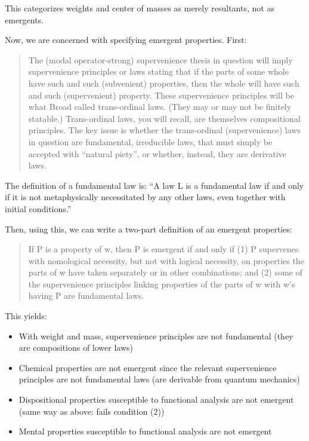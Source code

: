 \documentclass{article}
\begin{document}
This categorizes weights and center of masses as merely resultants, not as emergents.

Now, we are concerned with specifying emergent properties. First:

\begin{quote}
The (modal operator-strong) supervenience thesis in question will imply supervenience principles or laws stating that if the parts of some whole have such and such (subvenient) properties, then the whole will have such and such (supervenient) property. These supervenience principles will be what Broad called trans-ordinal laws. (They may or may not be finitely statable.) Trans-ordinal laws, you will recall, are themselves compositional principles. The key issue is whether the trans-ordinal (supervenience) laws in question are fundamental, irreducible laws, that must simply be accepted with ``natural piety'', or whether, instead, they are derivative laws.
\end{quote}

The definition of a fundamental law is: ``A law L is a fundamental law if and only if it is not metaphysically necessitated by any other laws, even together with initial conditions.''

Then, using this, we can write a two-part definition of an emergent properties:

\begin{quote}
If P is a property of w, then P is emergent if and only if (1) P supervenes with nomological necessity, but not with logical necessity, on properties the parts of w have taken separately or in other combinations; and (2) some of the supervenience principles linking properties of the parts of w with w's having P are fundamental laws.
\end{quote}

This yields:
\begin{itemize}
    \item With weight and mass, supervenience principles are not fundamental (they are compositions of lower laws)
    \item Chemical properties are not emergent since the relevant supervenience principles are not fundamental laws (are derivable from quantum mechanics)
    \item Dispositional properties susceptible to functional analysis are not emergent (same way as above: fails condition (2))
    \item Mental properties susceptible to functional analysis are not emergent
\end{itemize}
\end{document}
